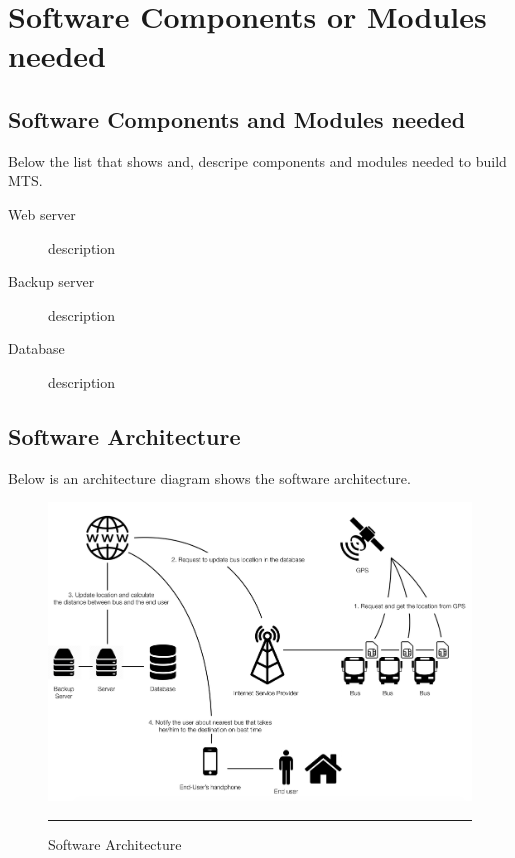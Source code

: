\chapter{Software Components or Modules needed} 

\label{Chapter6} 


\doublespacing

\section{Software Components and Modules needed}
Below the list that shows and, descripe components and modules needed to build MTS.

\begin{description}
	\item[Web server] description
	\item[Backup server] description
	\item[Database] description
	
\end{description}

\pagebreak
\section{Software Architecture}
Below is an architecture diagram shows the software architecture.
\begin{figure}[H]
	\centering
	\includegraphics[scale=0.5]{Figures/FigureProposedSoftwareArchitecture.png}
	\rule{35em}{0.5pt}
	\caption[Software Architecture]{Software Architecture}
\end{figure}
\pagebreak
